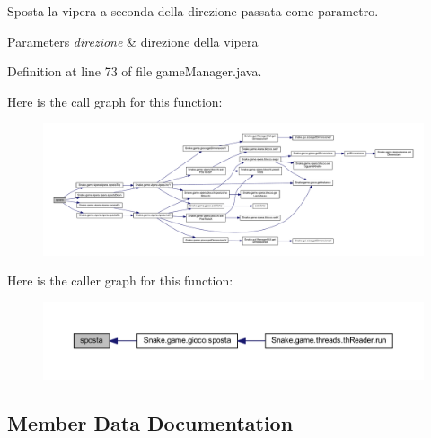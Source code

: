 Sposta la vipera a seconda della direzione passata come parametro. 


\begin{DoxyParams}{Parameters}
{\em direzione} & direzione della vipera \\
\hline
\end{DoxyParams}


Definition at line 73 of file game\+Manager.\+java.

Here is the call graph for this function\+:
\nopagebreak
\begin{figure}[H]
\begin{center}
\leavevmode
\includegraphics[width=350pt]{class_snake_1_1game_1_1utility_1_1game_manager_a9837912437f9fefee6140800ce8d6d76_cgraph}
\end{center}
\end{figure}
Here is the caller graph for this function\+:
\nopagebreak
\begin{figure}[H]
\begin{center}
\leavevmode
\includegraphics[width=350pt]{class_snake_1_1game_1_1utility_1_1game_manager_a9837912437f9fefee6140800ce8d6d76_icgraph}
\end{center}
\end{figure}


\subsection{Member Data Documentation}
\mbox{\label{class_snake_1_1game_1_1utility_1_1game_manager_a8ed97a1e91168bdb3e5d2dea4e59a977}} 
